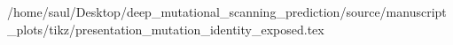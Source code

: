 /home/saul/Desktop/deep_mutational_scanning_prediction/source/manuscript_plots/tikz/presentation_mutation_identity_exposed.tex